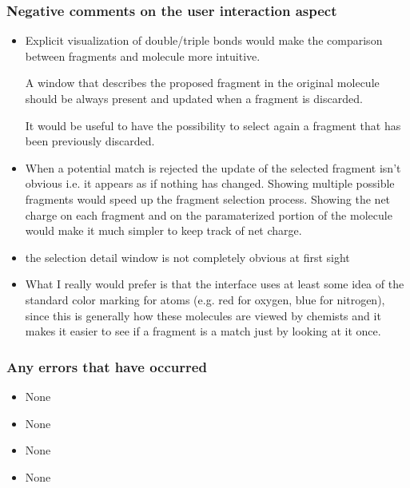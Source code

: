 \subsubsection{Negative comments on the user interaction aspect}
\begin{itemize}
\item Explicit visualization of double/triple bonds would make the comparison between fragments and molecule more intuitive.

A window that describes the proposed fragment in the original molecule should be always present and updated when a fragment is discarded.

It would be useful to have the possibility to select again a fragment that has been previously discarded.

\item When a potential match is rejected the update of the selected fragment isn't obvious i.e. it appears as if nothing has changed. Showing multiple possible fragments would speed up the fragment selection process. Showing the net charge on each fragment and on the paramaterized portion of the molecule would make it much simpler to keep track of net charge. 

\item the selection detail window is not completely obvious at first sight

\item What I really would prefer is that the interface uses at least some idea of the standard color marking for atoms (e.g. red for oxygen, blue for nitrogen), since this is generally how these molecules are viewed by chemists and it makes it easier to see if a fragment is a match just by looking at it once.

\end{itemize}


\subsubsection{Any errors that have occurred}
\begin{itemize}
\item None

\item None

\item None

\item None

\end{itemize}


